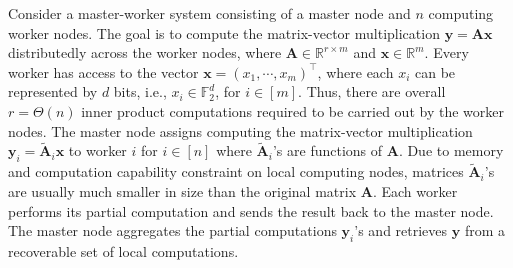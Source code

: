 \documentclass[onecolumn,journal,twoside]{IEEEtran}
\begin{document}
Consider a master-worker system consisting of a master node and $n$ computing worker nodes. The goal is to compute the matrix-vector multiplication $\mathbf{y}=\mathbf{Ax}$ distributedly across the worker nodes, where $\mathbf{A}\in\mathbb{R}^{r\times m}$ and $\mathbf{x}\in\mathbb{R}^{ m}$. Every worker has access to the vector $\mathbf{x}=(x_1,\cdots,x_m)^\top$, where each $x_i$ can be represented by $d$ bits, i.e., $x_i\in \mathbb{F}_2^d$, for $i\in [m]$. Thus, there are overall $r=\Theta(n)$ inner product computations required to be carried out by the worker nodes. 
The master node assigns computing the matrix-vector multiplication $\mathbf{y}_i=\widetilde{\mathbf{A}}_i\mathbf{x}$ to worker $i$ for $i \in [n]$ where $\widetilde{\mathbf{A}}_i$'s are functions of $\mathbf{A}$. Due to memory and computation capability constraint on local computing nodes, matrices $\widetilde{\mathbf{A}}_i$'s are usually much smaller in size than the original matrix $\mathbf{A}$. Each worker performs its partial computation and sends the result back to the master node. The master node aggregates the partial computations $\mathbf{y}_i$'s and retrieves $\mathbf{y}$ from a recoverable set of local computations. 
\end{document}
